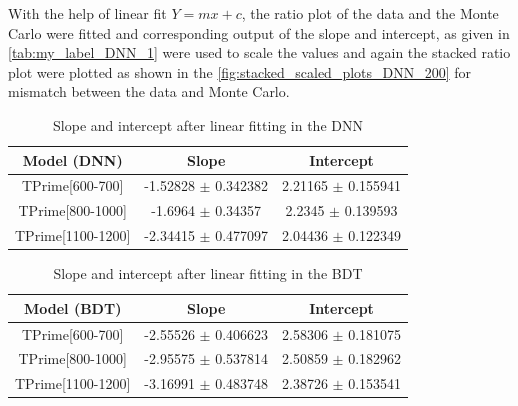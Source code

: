 With the help of linear fit $Y = mx+c$, the ratio plot of the data and the Monte Carlo were fitted and corresponding output of the slope and intercept, as given in \autoref{tab:my_label_DNN_1} were used to scale the values and again the stacked ratio plot were plotted as shown in the \autoref{fig:stacked_scaled_plots_DNN_200} for mismatch between the data and Monte Carlo. 


\begin{table}[H]
    \centering
    \begin{tabular}{|c|c|c|}\hline
     Model (DNN)   & Slope & Intercept \\ \hline
      TPrime[600-700]   &  -1.52828 $\pm$ 0.342382 & 2.21165 $\pm$ 0.155941  \\
       TPrime[800-1000]   &  -1.6964 $\pm$ 0.34357 & 2.2345 $\pm$ 0.139593 \\
          TPrime[1100-1200]   &  -2.34415 $\pm$ 0.477097 &  2.04436 $\pm$  0.122349  \\\hline
    \end{tabular}
    \caption{Slope and intercept after linear fitting in the DNN}
    \label{tab:my_label_DNN_1}
\end{table}




\begin{table}[H]
    \centering
    \begin{tabular}{|c|c|c|}\hline
     Model (BDT)   & Slope & Intercept \\ \hline
      TPrime[600-700]   &  -2.55526 $\pm$ 0.406623 & 2.58306 $\pm$ 0.181075  \\
       TPrime[800-1000]   &  -2.95575 $\pm$ 0.537814 & 2.50859 $\pm$ 0.182962 \\
          TPrime[1100-1200]   &  -3.16991 $\pm$ 0.483748 &  2.38726 $\pm$  0.153541  \\\hline
    \end{tabular}
    \caption{Slope and intercept after linear fitting in the BDT}
    \label{tab:my_label_BDT_table}
\end{table}



